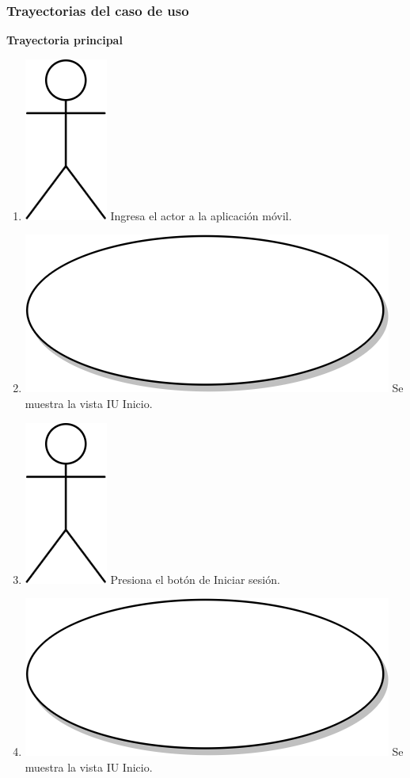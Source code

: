 \subsubsection{Trayectorias del caso de uso}
\textbf{Trayectoria principal}
\begin{enumerate}
 \item {\includegraphics[scale=.1]{Capitulo3/img/actor.png} Ingresa el actor a la aplicación móvil.}
\item {\includegraphics[scale=.05]{Capitulo3/img/proceso.png} Se muestra la vista IU Inicio.}
\item {\includegraphics[scale=.1]{Capitulo3/img/actor.png} Presiona el botón de Iniciar sesión.}
\item {\includegraphics[scale=.05]{Capitulo3/img/proceso.png} Se muestra la vista IU Inicio.}

\end{enumerate}
